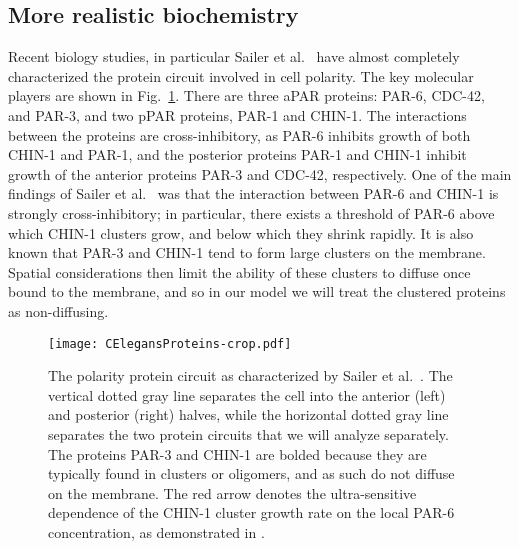 \documentclass[11pt]{article}
\newcommand{\6}[1]{#1_{\text{6}}}
\newcommand{\3}[1]{#1_{\text{3}}}
\begin{document}
\subsection{More realistic biochemistry \label{sec:BCSailer}}
Recent biology studies, in particular Sailer et al.\ \cite{sailer2015dynamic} have almost completely characterized the protein circuit involved in cell polarity. The key molecular players are shown in Fig.\ \ref{fig:ProtCirc}. There are three aPAR proteins: PAR-6, CDC-42, and PAR-3, and two pPAR proteins, PAR-1 and CHIN-1. The interactions between the proteins are cross-inhibitory, as PAR-6 inhibits growth of both CHIN-1 and PAR-1, and the posterior proteins PAR-1 and CHIN-1 inhibit growth of the anterior proteins PAR-3 and CDC-42, respectively. One of the main findings of Sailer et al.\ \cite{sailer2015dynamic} was that the interaction between PAR-6 and CHIN-1 is strongly cross-inhibitory; in particular, there exists a threshold of PAR-6 above which CHIN-1 clusters grow, and below which they shrink rapidly. It is also known that PAR-3 and CHIN-1 tend to form large clusters on the membrane. Spatial considerations then limit the ability of these clusters to diffuse once bound to the membrane, and so in our model we will treat the clustered proteins as non-diffusing.

\begin{figure}
\centering
\texttt{[image: CElegansProteins-crop.pdf]}
\caption{\label{fig:ProtCirc}The polarity protein circuit as characterized by Sailer et al.\ \cite{sailer2015dynamic}. The vertical dotted gray line separates the cell into the anterior (left) and posterior (right) halves, while the horizontal dotted gray line separates the two protein circuits that we will analyze separately. The proteins PAR-3 and CHIN-1 are bolded because they are typically found in clusters or oligomers, and as such do not diffuse on the membrane. The red arrow denotes the ultra-sensitive dependence of the CHIN-1 cluster growth rate on the local PAR-6 concentration, as demonstrated in \cite{sailer2015dynamic}.}
\end{figure}
\end{document}
